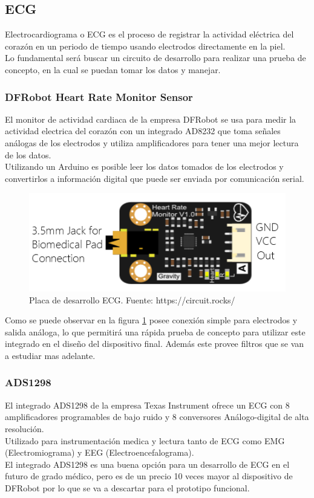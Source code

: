 \subsection{ECG}
Electrocardiograma o ECG es el proceso de registrar la actividad eléctrica del corazón en un periodo de tiempo usando electrodos directamente en la piel.\\
Lo fundamental será buscar un circuito de desarrollo para realizar una prueba de concepto, en la cual se puedan tomar los datos y manejar.
\subsubsection{DFRobot Heart Rate Monitor Sensor}
El monitor de actividad cardiaca de la empresa DFRobot se usa para medir la actividad electrica del corazón con un integrado AD8232\cite{ad8232} que toma señales análogas de los electrodos y utiliza amplificadores para tener una mejor lectura de los datos.\\
Utilizando un Arduino es posible leer los datos tomados de los electrodos y convertirlos a información digital que puede ser enviada por comunicación serial.\\

\begin{figure}[H]
	\centering
	\includegraphics[scale=0.5]{figuras/sensor/ecg/ecg.png}
	\caption{Placa de desarrollo ECG. Fuente: https://circuit.rocks/}
	\label{ecg}
\end{figure}

Como se puede observar en la figura \ref{ecg} posee conexión simple para electrodos y salida análoga, lo que permitirá una rápida prueba de concepto para utilizar este integrado en el diseño del dispositivo final. Además este provee filtros que se van a estudiar mas adelante.


\subsubsection{ADS1298}
El integrado ADS1298 de la empresa Texas Instrument ofrece un ECG con 8 amplificadores programables de bajo ruido y 8 conversores Análogo-digital de alta resolución.\\
Utilizado para instrumentación medica y lectura tanto de ECG como EMG (Electromiograma) y EEG (Electroencefalograma).\\
El integrado ADS1298 es una buena opción para un desarrollo de ECG en el futuro de grado médico, pero es de un precio 10 veces mayor al dispositivo de DFRobot por lo que se va a descartar para el prototipo funcional.
